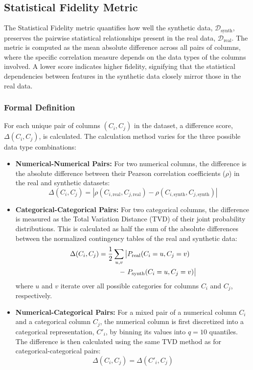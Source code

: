 \subsection{Statistical Fidelity Metric}
\label{app:fidelity_metric}

The Statistical Fidelity metric quantifies how well the synthetic data, $\mathcal{D}_{\text{synth}}$, preserves the pairwise statistical relationships present in the real data, $\mathcal{D}_{\text{real}}$. The metric is computed as the mean absolute difference across all pairs of columns, where the specific correlation measure depends on the data types of the columns involved. A lower score indicates higher fidelity, signifying that the statistical dependencies between features in the synthetic data closely mirror those in the real data.

\subsubsection{Formal Definition}
For each unique pair of columns $(C_i, C_j)$ in the dataset, a difference score, $\Delta(C_i, C_j)$, is calculated. The calculation method varies for the three possible data type combinations:

\begin{itemize}[leftmargin=*]
    \item {\textbf{Numerical-Numerical Pairs:} For two numerical columns, the difference is the absolute difference between their Pearson correlation coefficients ($\rho$) in the real and synthetic datasets:
\begin{equation}
    \Delta(C_i, C_j) = |\rho(C_{i, \text{real}}, C_{j, \text{real}}) - \rho(C_{i, \text{synth}}, C_{j, \text{synth}})|
\end{equation}
}
    \item {\textbf{Categorical-Categorical Pairs: } For two categorical columns, the difference is measured as the Total Variation Distance (TVD) of their joint probability distributions. This is calculated as half the sum of the absolute differences between the normalized contingency tables of the real and synthetic data:
\begin{align}
    \Delta(C_i, C_j) = \frac{1}{2} \sum_{u,v} \big| 
    & P_{\text{real}}(C_i=u, C_j=v) \notag \\
    -\ & P_{\text{synth}}(C_i=u, C_j=v) \big|
\end{align}
where $u$ and $v$ iterate over all possible categories for columns $C_i$ and $C_j$, respectively.}
    \item {\textbf{Numerical-Categorical Pairs:} For a mixed pair of a numerical column $C_i$ and a categorical column $C_j$, the numerical column is first discretized into a categorical representation, $C'_i$, by binning its values into $q=10$ quantiles. The difference is then calculated using the same TVD method as for categorical-categorical pairs:
\begin{equation}
    \Delta(C_i, C_j) = \Delta(C'_i, C_j)
\end{equation}}
\end{itemize}


